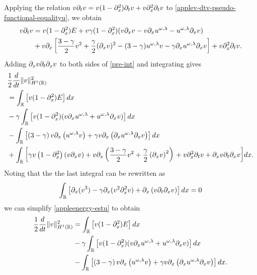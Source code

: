 Applying the relation $v\partial_t v = v(1-\partial_x^2) \partial_t v + v\partial_x^2 \partial_t v$ to
\eqref{applev-dtv-pseudo-functional-equalityu}, we obtain
\begin{equation}
\label{pre-int}
\begin{split}
v \partial_t v &= v(1- \partial_x^2)E + v\gamma(1- \partial_x^2)(v\partial_x v - v\partial_x u^{\omega,\lambda} -
u^{\omega,\lambda} \partial_x v)
\\
&+ v\partial_x \left[ \frac{3-\gamma}{2}v^2 + \frac{\gamma}{2}(\partial_x v)^2 -
(3-\gamma)u^{\omega,\lambda} v - \gamma \partial_x u^{\omega,\lambda} \partial_x v
\right] + v\partial_x^2 \partial_t v.
\end{split}
\end{equation}
Adding $\partial_x v \partial_t \partial_x v$ to both sides of \eqref{pre-int} and 
integrating gives
\begin{equation}
\label{appleenergy-estu}
\begin{split}
&\frac{1}{2} \frac{d}{dt} \|v\|_{H^1(\mathbb{R})}^2  
\\
& =  \int_{\mathbb{R}} \left[ v(1-\partial_x^2)E \right]dx
\\
& - \gamma \int_{\mathbb{R}} \left[ v(1-\partial_x^2)(v\partial_x u^{\omega,\lambda} + u^{\omega,\lambda} \partial_x v) \right]dx
\\
&- \int_{\mathbb{R}}\left[ \left( 3-\gamma \right)v \partial_x\left( u^{\omega,\lambda}v \right) + \gamma v
\partial_x \left( \partial_x u^{\omega,\lambda} \partial_x v \right)\right]dx
\\
&+  \int_{\mathbb{R}}
\left[ \gamma v \left( 1-\partial_x^2 \right)\left( v \partial_x v \right) + v
\partial_x \left( \frac{3-\gamma}{2} v^2 + \frac{\gamma}{2}\left( \partial_x v \right)^2
\right) \right . +  v \partial_x^2 \partial_t v + \partial_x v \partial_t \partial_x v\bigg]dx.
\end{split}
\end{equation}
Noting that the the last integral can be rewritten as 
\begin{equation*}
\begin{split}
\int_{\mathbb{R}} \left[ \partial_x (v^3) - \gamma \partial_x (v^2 \partial_x^2 v) + \partial_x\left( v \partial_t
\partial_x v
\right) \right]dx  = 0
\end{split}
\end{equation*}
%
we can simplify \eqref{appleenergy-estu} to obtain
%
%
\begin{equation}
\label{appleenergy-est}
\begin{split}
\frac{1}{2} \frac{d}{dt} \|v\|_{H^1(\mathbb{R})}^2  
& = 
\int_{\mathbb{R}} \left[ v(1-\partial_x^2)E \right]dx\\
&-
\gamma \int_{\mathbb{R}} \left[ v(1-\partial_x^2)(v\partial_x u^{\omega,\lambda} + 
u^{\omega,\lambda} \partial_x v) \right]dx
\\
&- \int_{\mathbb{R}}\left[ \left( 3-\gamma \right)v \partial_x\left( u^{\omega,\lambda}v 
\right) + \gamma v
\partial_x \left( \partial_x u^{\omega,\lambda} \partial_x v \right)\right]dx.
\end{split}
\end{equation}
